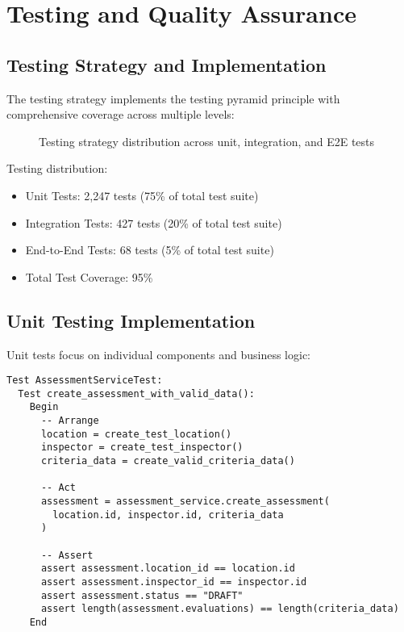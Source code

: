\documentclass[a4paper,12pt,oneside]{book}
\begin{document}
\chapter{Testing and Quality Assurance}
\section{Testing Strategy and Implementation}

The testing strategy implements the testing pyramid principle with comprehensive coverage across multiple levels:

\begin{figure}[h]
\centering
{}
\caption{Testing strategy distribution across unit, integration, and E2E tests}
\label{fig:testing-pyramid}
\end{figure}

Testing distribution:
\begin{itemize}
    \item Unit Tests: 2,247 tests (75\% of total test suite)
    \item Integration Tests: 427 tests (20\% of total test suite)
    \item End-to-End Tests: 68 tests (5\% of total test suite)
    \item Total Test Coverage: 95\%
\end{itemize}

\section{Unit Testing Implementation}

Unit tests focus on individual components and business logic:

\begin{lstlisting}[language=Pseudocode, caption=Unit Test Example for Assessment Service]
Test AssessmentServiceTest:
  Test create_assessment_with_valid_data():
    Begin
      -- Arrange
      location = create_test_location()
      inspector = create_test_inspector()
      criteria_data = create_valid_criteria_data()
      
      -- Act  
      assessment = assessment_service.create_assessment(
        location.id, inspector.id, criteria_data
      )
      
      -- Assert
      assert assessment.location_id == location.id
      assert assessment.inspector_id == inspector.id
      assert assessment.status == "DRAFT"
      assert length(assessment.evaluations) == length(criteria_data)
    End
\end{lstlisting}
\end{document}
